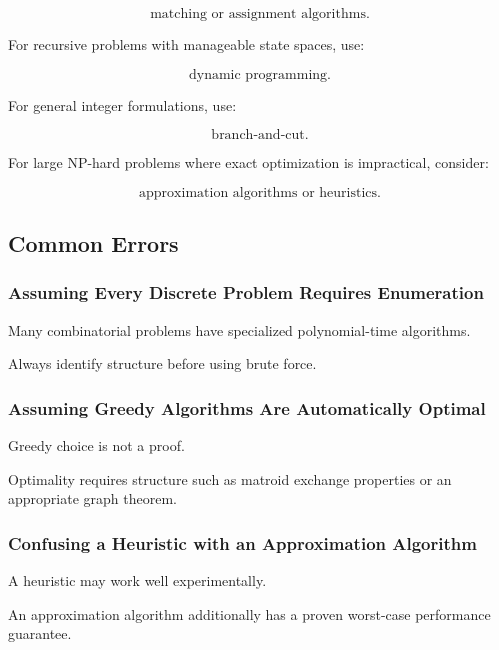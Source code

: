 \[
\boxed{
\text{matching or assignment algorithms}.
}
\]

For recursive problems with manageable state spaces, use:

\[
\boxed{
\text{dynamic programming}.
}
\]

For general integer formulations, use:

\[
\boxed{
\text{branch-and-cut}.
}
\]

For large NP-hard problems where exact optimization is impractical,
consider:

\[
\boxed{
\text{approximation algorithms or heuristics}.
}
\]

\subsection{Common Errors}
\label{subsec:combinatorial-optimization-common-errors}

\subsubsection{Assuming Every Discrete Problem Requires Enumeration}

Many combinatorial problems have specialized polynomial-time algorithms.

Always identify structure before using brute force.

\subsubsection{Assuming Greedy Algorithms Are Automatically Optimal}

Greedy choice is not a proof.

Optimality requires structure such as matroid exchange properties or an
appropriate graph theorem.

\subsubsection{Confusing a Heuristic with an Approximation Algorithm}

A heuristic may work well experimentally.

An approximation algorithm additionally has a proven worst-case
performance guarantee.

